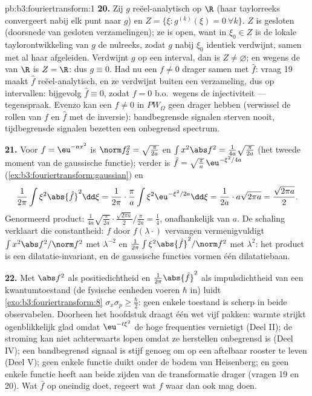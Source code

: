 \begin{solution}{pb:b3:fouriertransform:1}
\textbf{20.} Zij $g$ reëel-analytisch op $\R$ (haar taylorreeks
convergeert nabij elk punt naar $g$) en $Z = \{\xi :
g^{(k)}(\xi) = 0\ \forall k\}$. $Z$ is gesloten (doorsnede van
gesloten verzamelingen); ze is open, want in $\xi_0 \in Z$ is de
lokale taylorontwikkeling van $g$ de nulreeks, zodat $g$ nabij
$\xi_0$ identiek verdwijnt, samen met al haar afgeleiden.
Verdwijnt $g$ op een interval, dan is $Z \neq \varnothing$; en
wegens de  van $\R$ is $Z = \R$: dus $g \equiv 0$. Had
nu een $f \neq 0$  drager samen met $\hat f$: vraag 19
maakt $\hat f$ reëel-analytisch, en ze verdwijnt buiten een
 verzameling, dus op intervallen: bijgevolg $\hat f
\equiv 0$, zodat $f = 0$ b.o.\ wegens de injectiviteit ---
tegenspraak. Evenzo kan een $f \neq 0$ in $PW_\Omega$ geen
 drager hebben (verwissel de rollen van $f$ en $\hat f$
met de inversie): bandbegrensde signalen sterven nooit,
tijdbegrensde signalen bezetten een onbegrensd spectrum.

\textbf{21.} Voor $f = \eu^{-ax^2}$ is $\norm f_2^2 =
\sqrt{\frac\pi{2a}}$ en $\int x^2\abs f^2 =
\frac1{4a}\sqrt{\frac{\pi}{2a}}$ (het tweede moment van de
gaussische functie); verder is $\hat f = \sqrt{\frac\pi
a}\,\eu^{-\xi^2/4a}$ (\cref{ex:b3:fouriertransform:gaussian}) en
\[
\frac1{2\pi}\int\xi^2\abs{\hat f}^2\dd\xi =
\frac1{2\pi}\cdot\frac\pi a\int\xi^2
\eu^{-\xi^2/2a}\dd\xi = \frac1{2a}\cdot a\sqrt{2\pi a}
= \frac{\sqrt{2\pi a}}2 .
\]
Genormeerd product: $\frac1{4a}\sqrt{\frac\pi{2a}}\cdot
\frac{\sqrt{2\pi a}}2\big/\frac{\pi}{2a} = \frac14$, onafhankelijk
van $a$. De schaling verklaart die constantheid: $f$ door
$f(\lambda\cdot)$ vervangen vermenigvuldigt $\int x^2\abs
f^2/\norm f^2$ met $\lambda^{-2}$ en $\frac1{2\pi}\int\xi^2\abs{\hat
f}^2/\norm f^2$ met $\lambda^{2}$: het product is een
dilatatie-invariant, en de gaussische functies vormen één
dilatatiebaan.

\textbf{22.} Met $\abs f^2$ als positiedichtheid en
$\frac1{2\pi}\abs{\hat f}^2$ als impulsdichtheid van een
kwantumtoestand (de fysische eenheden voeren $\hbar$ in) luidt
\cref{exo:b3:fouriertransform:8} $\sigma_x\sigma_p \geq
\frac\hbar2$: geen enkele toestand is scherp in beide
observabelen. Doorheen het hoofdstuk draagt één wet vijf pakken:
warmte strijkt ogenblikkelijk glad omdat $\eu^{-t\xi^2}$ de hoge
frequenties vernietigt (Deel II); de stroming kan niet
achterwaarts lopen omdat ze herstellen onbegrensd is (Deel IV);
een bandbegrensd signaal is stijf genoeg om op een aftelbaar
rooster te leven (Deel V); geen enkele functie duikt onder de
bodem van Heisenberg; en geen enkele functie heeft aan beide
zijden van de transformatie  drager (vragen 19 en 20).
Wat $\hat f$ op oneindig doet, regeert wat $f$ waar dan ook mag
doen.


\end{solution}
